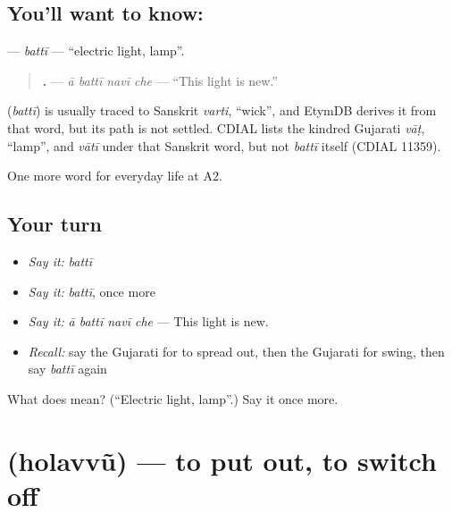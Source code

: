 \subsection*{You'll want to know: }
\textbf{} — \emph{battī} — \textquotedblleft{}electric light, lamp\textquotedblright{}.

\begin{quote}
\textbf{   .} — \emph{ā battī navī che} — \textquotedblleft{}This light is new.\textquotedblright{}
\end{quote}

\begin{cousinweb}
\textbf{} (\emph{battī}) is usually traced to Sanskrit \emph{varti}, \textquotedblleft{}wick\textquotedblright{}, and EtymDB derives it from that word, but its path is not settled. CDIAL lists the kindred Gujarati \emph{vāṭ}, \textquotedblleft{}lamp\textquotedblright{}, and \emph{vātī} under that Sanskrit word, but not \emph{battī} itself (CDIAL 11359).
\end{cousinweb}

\begin{grammarlens}[title={What you've built}]
One more word for everyday life at A2.
\end{grammarlens}

\subsection*{Your turn}
\begin{itemize}
\raggedright
  \item \emph{Say it:} \emph{battī}
  \item \emph{Say it:} \emph{battī}, once more
  \item \emph{Say it:} \emph{ā battī navī che} — This light is new.
  \item \emph{Recall:} say the Gujarati for to spread out, then the Gujarati for swing, then say \emph{battī} again
\end{itemize}

\begin{tcolorbox}[breakable,colback=teal!4,colframe=teal!35!black,title={Before you move on}]
What does  mean? (\textquotedblleft{}Electric light, lamp\textquotedblright{}.) Say it once more.
\end{tcolorbox}
\section[\texorpdfstring{\gu{હોલવવું} (holavvũ)}{હોલવવું (holavvũ)}]{ (holavvũ) — to put out, to switch off}

